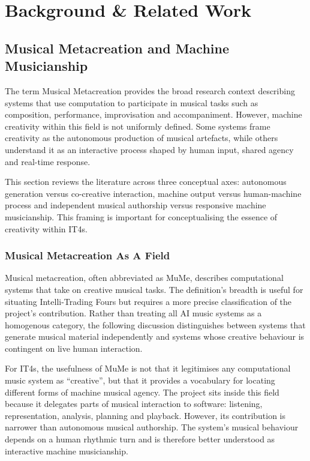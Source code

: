 \chapter{Background \& Related Work}\label{background-related-work}

\section{Musical Metacreation and Machine Musicianship}\label{musical-metacreation-and-machine-musicianship}

The term Musical Metacreation \citep{pasquier2016introduction} provides the broad
research context describing systems that use computation to participate
in musical tasks such as composition, performance, improvisation and
accompaniment. However, machine creativity within this field is not
uniformly defined. Some systems frame creativity as the autonomous
production of musical artefacts, while others understand it as an
interactive process shaped by human input, shared agency and real-time
response.

This section reviews the literature across three conceptual axes:
autonomous generation versus co-creative interaction, machine output
versus human-machine process and independent musical authorship versus
responsive machine musicianship. This framing is important for
conceptualising the essence of creativity within IT4s.

\subsection{Musical Metacreation As A Field}\label{musical-metacreation-as-a-field}

Musical metacreation, often abbreviated as MuMe, describes computational
systems that take on creative musical tasks. The definition's breadth is
useful for situating Intelli-Trading Fours but requires a more precise
classification of the project's contribution. Rather than treating all
AI music systems as a homogenous category, the following discussion
distinguishes between systems that generate musical material
independently and systems whose creative behaviour is contingent on live
human interaction.

For IT4s, the usefulness of MuMe is not that it legitimises any
computational music system as ``creative'', but that it provides a
vocabulary for locating different forms of machine musical agency. The
project sits inside this field because it delegates parts of musical
interaction to software: listening, representation, analysis, planning
and playback. However, its contribution is narrower than autonomous
musical authorship. The system's musical behaviour depends on a human
rhythmic turn and is therefore better understood as interactive machine
musicianship.


